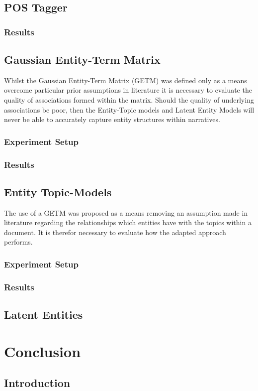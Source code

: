 \documentclass[10pt]{report}
\begin{document}
\section{POS Tagger}

\subsection{Results}


\section{Gaussian Entity-Term Matrix}
Whilst the Gaussian Entity-Term Matrix (GETM) was defined only as a means overcome particular prior assumptions in literature it is necessary to evaluate the quality of associations formed within the matrix. Should the quality of underlying associations be poor, then the Entity-Topic models and Latent Entity Models will never be able to accurately capture entity structures within narratives.

\subsection{Experiment Setup}

\subsection{Results}

\section{Entity Topic-Models}
The use of a GETM was proposed as a means removing an assumption made in literature regarding the relationships which entities have with the topics within a document. It is therefor necessary to evaluate how the adapted approach performs.

\subsection{Experiment Setup}

\subsection{Results}

\section{Latent Entities}

%
%
%
%
\chapter{Conclusion}
\section{Introduction}

\renewcommand{\baselinestretch}{1.0}\normalsize


\end{document}
